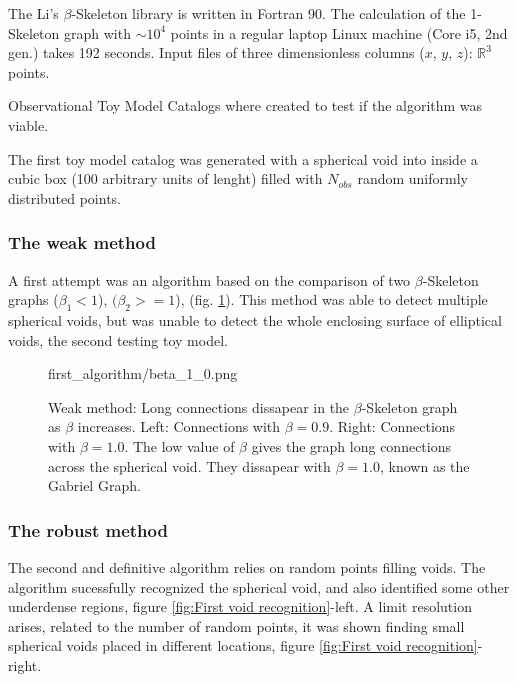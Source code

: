 \documentclass[preprint]{aastex62}
\begin{document}
The Li's $\beta$-Skeleton library \citep{Li..Github..2014} is written in
Fortran 90. The calculation of the 1-Skeleton graph with $\sim 10^4$ points
in a regular laptop Linux machine (Core i5, 2nd gen.) takes 192 seconds.
Input files of three dimensionless columns ($x$, $y$, $z$): $\mathbb{R}^3$
points.

Observational Toy Model Catalogs where created to test if the algorithm was
viable. 

The first toy model catalog was generated with a spherical void into inside
a cubic box (100 arbitrary units of lenght) filled with $N_{obs}$ random
uniformly distributed points.

\subsubsection{The weak method}
A first attempt was an algorithm based on
the comparison of two $\beta$-Skeleton graphs ($\beta_1 < 1$), $(\beta_2 >= 1$),
(fig. \ref{fig:first_algorithm}). This method was able to detect multiple
spherical voids, but was unable to detect the whole enclosing surface of
elliptical voids, the second testing toy model. 

\begin{figure}
          {first_algorithm/beta_1_0.png}
  \caption{Weak method: Long connections dissapear in the
    $\beta$-Skeleton graph as $\beta$ increases.
    Left: Connections with $\beta=0.9$. Right: Connections with $\beta=1.0$.
    The low value of $\beta$ gives the graph long connections across the
    spherical void. They dissapear with $\beta = 1.0$, known as the Gabriel
    Graph. \label{fig:first_algorithm}} 
\end{figure}

\subsubsection{The robust method}
The second and definitive algorithm relies on random points filling voids.
The algorithm sucessfully recognized the spherical void, and also identified
some other underdense regions, figure \ref{fig:First void recognition}-left.
A limit resolution arises, related to the number of random points, it was
shown finding small spherical voids placed in different locations, figure
\ref{fig:First void recognition}-right.
\end{document}

